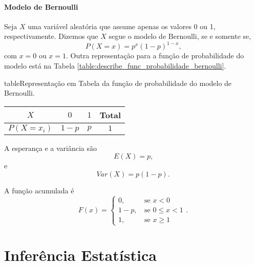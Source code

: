 \documentclass[11pt,fleqn]{book}
\numberwithin{mpicture}{chapter}
\numberwithin{mtable}{chapter}
\numberwithin{mframe}{chapter}
\begin{document}
\subsection{Modelo de Bernoulli}

Seja $X$ uma variável aleatória que assume apenas os valores 0 ou 1, respectivamente. Dizemos que $X$ segue o modelo de Bernoulli, se e somente se,
\begin{equation}
	P(X=x)=p^x(1-p)^{1-x}\text{,}
\end{equation}
com $x=0$ ou $x=1$. Outra representação para a função de probabilidade do modelo está na Tabela \ref{table:describe_func_probabilidade_bernoulli}.

\begin{sidepicture}{5cm}{table}{Representação em Tabela da função de probabilidade do modelo de Bernoulli.}
	\label{table:describe_func_probabilidade_bernoulli}
	\begin{tabular}{c|cc|c}\toprule
		$X$ & $0$ & $1$ & Total \\ \midrule
		$P(X=x_i)$ & $1-p$ & $p$ & $1$\\\bottomrule
	\end{tabular}
\end{sidepicture}

A esperança e a variância são
\begin{equation}
	E(X)=p\text{,}
\end{equation}
e
\begin{equation}
	Var(X)=p(1-p)\text{.}
\end{equation}


A função acumulada é
\begin{equation}
	F(x)=\begin{cases}
		0\text{,}&\text{ se }x < 0\\
		1-p\text{,}&\text{ se }0\leqslant x < 1\\
		1\text{,}&\text{ se } x\geqslant 1
	\end{cases}
	\text{.}
\end{equation}




\nosidepicturearea
\part{Inferência Estatística}

\end{document}
